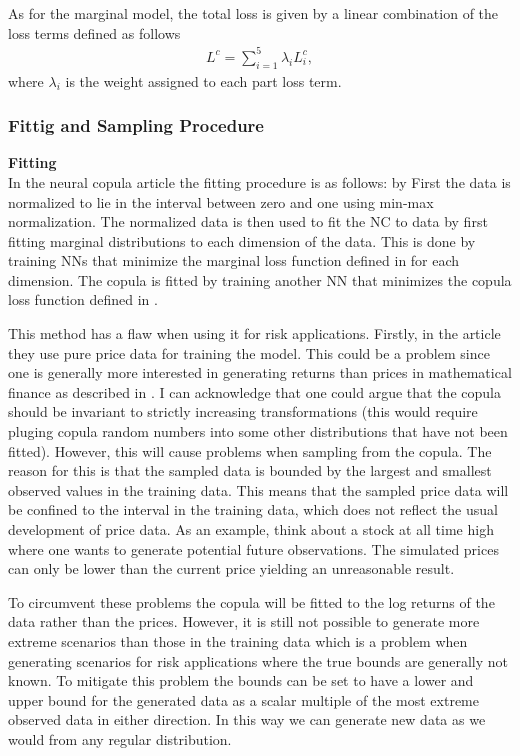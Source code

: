 As for the marginal model, the total loss is given by a linear combination of the loss terms defined as follows
\begin{align*}
    L^c = \sum_{i=1}^5 \lambda_i L_i^c,
\end{align*}
where $\lambda_i$ is the weight assigned to each part loss term. 


\subsubsection{Fittig and Sampling Procedure}\label{sec:NeuralCopulaFittingAndSampling}
\textbf{Fitting}\\
In the neural copula article the fitting procedure is as follows: by 
First the data is normalized to lie in the interval between zero and one using min-max normalization. The normalized data is then used to fit the \gls{NC} to data by first fitting marginal distributions to each dimension of the data. This is done by training \gls{NN}s that minimize the marginal loss function defined in  for each dimension. The copula is fitted by training another \gls{NN} that minimizes the copula loss function defined in . 

\begin{generalinstructions}
    This method has a flaw when using it for risk applications. Firstly, in the article they use pure price data for training the model. This could be a problem since one is generally more interested in generating returns than prices in mathematical finance as described in . I can acknowledge that one could argue that the copula should be invariant to strictly increasing transformations (this would require pluging copula random numbers into some other distributions that have not been fitted). However, this will cause problems when sampling from the copula. The reason for this is that the sampled data is bounded by the largest and smallest observed values in the training data. This means that the sampled price data will be confined to the interval in the training data, which does not reflect the usual development of price data. As an example, think about a stock at all time high where one wants to generate potential future observations. The simulated prices can only be lower than the current price yielding an unreasonable result. 
    
    To circumvent these problems the copula will be fitted to the log returns of the data rather than the prices. However, it is still not possible to generate more extreme scenarios than those in the training data which is a problem when generating scenarios for risk applications where the true bounds are generally not known. To mitigate this problem the bounds can be set to have a lower and upper bound for the generated data as a scalar multiple of the most extreme observed data in either direction. In this way we can generate new data as we would from any regular distribution. 
\end{generalinstructions}


